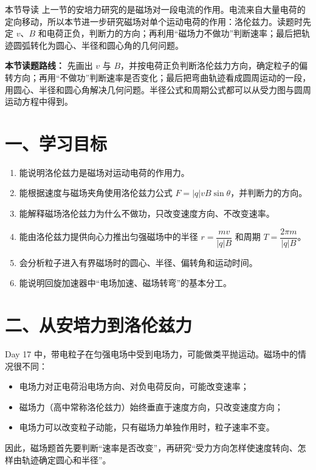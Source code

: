 
\begin{learningbox}{本节导读}
上一节的安培力研究的是磁场对一段电流的作用。电流来自大量电荷的定向移动，所以本节进一步研究磁场对单个运动电荷的作用：洛伦兹力。读题时先定 $v$、$B$ 和电荷正负，判断力的方向；再利用“磁场力不做功”判断速率；最后把轨迹圆弧转化为圆心、半径和圆心角的几何问题。
\end{learningbox}

\textbf{本节读题路线：} 先画出 $v$ 与 $B$，并按电荷正负判断洛伦兹力方向，确定粒子的偏转方向；再用“不做功”判断速率是否变化；最后把弯曲轨迹看成圆周运动的一段，用圆心、半径和圆心角解决几何问题。半径公式和周期公式都可以从受力图与圆周运动方程中得到。

\section*{一、学习目标}
\begin{enumerate}
  \item 能说明洛伦兹力是磁场对运动电荷的作用力。
  \item 能根据速度与磁场夹角使用洛伦兹力公式 $F=|q|vB\sin\theta$，并判断力的方向。
  \item 能解释磁场洛伦兹力为什么不做功，只改变速度方向、不改变速率。
  \item 能由洛伦兹力提供向心力推出匀强磁场中的半径 $r=\dfrac{mv}{|q|B}$ 和周期 $T=\dfrac{2\pi m}{|q|B}$。
  \item 会分析粒子进入有界磁场时的圆心、半径、偏转角和运动时间。
  \item 能说明回旋加速器中“电场加速、磁场转弯”的基本分工。
\end{enumerate}
\section*{二、从安培力到洛伦兹力}

Day 17 中，带电粒子在匀强电场中受到电场力，可能做类平抛运动。磁场中的情况很不同：
\begin{itemize}
  \item 电场力对正电荷沿电场方向、对负电荷反向，可能改变速率；
  \item 磁场力（高中常称洛伦兹力）始终垂直于速度方向，只改变速度方向；
  \item 电场力可以改变粒子动能，只有磁场力单独作用时，粒子速率不变。
\end{itemize}

因此，磁场题首先要判断“速率是否改变”，再研究“受力方向怎样使速度转向、怎样由轨迹确定圆心和半径”。

